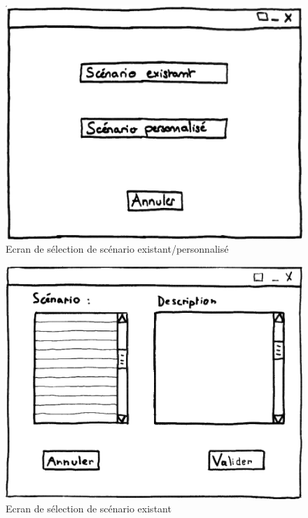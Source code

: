 \documentclass[12pt]{report}
\begin{document}
\begin{figure}
\centering
\includegraphics[scale=0.5]{IHM_2a.png}
\caption{Ecran de sélection de scénario existant/personnalisé}
\end{figure}
\begin{figure}
\centering
\includegraphics[scale=0.5]{IHM_2b.png}
\caption{Ecran de sélection de scénario existant}
\end{figure}
\end{document}
